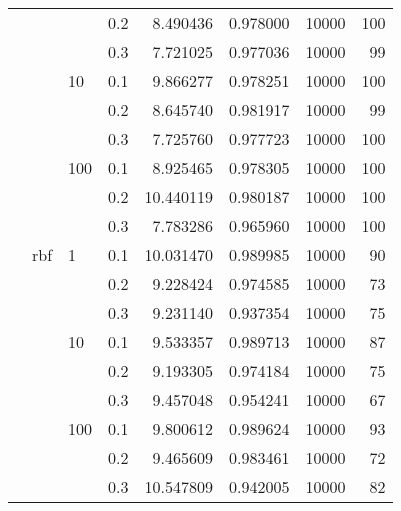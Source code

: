 \begin{table}[H]
\begin{tabular}{llllrrrr}
           &     &     & 0.2 &   8.490436 &  0.978000 &   10000 &   100 \\
           &     &     & 0.3 &   7.721025 &  0.977036 &   10000 &    99 \\
           &     & 10  & 0.1 &   9.866277 &  0.978251 &   10000 &   100 \\
           &     &     & 0.2 &   8.645740 &  0.981917 &   10000 &    99 \\
           &     &     & 0.3 &   7.725760 &  0.977723 &   10000 &   100 \\
           &     & 100 & 0.1 &   8.925465 &  0.978305 &   10000 &   100 \\
           &     &     & 0.2 &  10.440119 &  0.980187 &   10000 &   100 \\
           &     &     & 0.3 &   7.783286 &  0.965960 &   10000 &   100 \\
           & rbf & 1   & 0.1 &  10.031470 &  0.989985 &   10000 &    90 \\
           &     &     & 0.2 &   9.228424 &  0.974585 &   10000 &    73 \\
           &     &     & 0.3 &   9.231140 &  0.937354 &   10000 &    75 \\
           &     & 10  & 0.1 &   9.533357 &  0.989713 &   10000 &    87 \\
           &     &     & 0.2 &   9.193305 &  0.974184 &   10000 &    75 \\
           &     &     & 0.3 &   9.457048 &  0.954241 &   10000 &    67 \\
           &     & 100 & 0.1 &   9.800612 &  0.989624 &   10000 &    93 \\
           &     &     & 0.2 &   9.465609 &  0.983461 &   10000 &    72 \\
           &     &     & 0.3 &  10.547809 &  0.942005 &   10000 &    82 \\
\bottomrule
\end{tabular}
\end{table}

